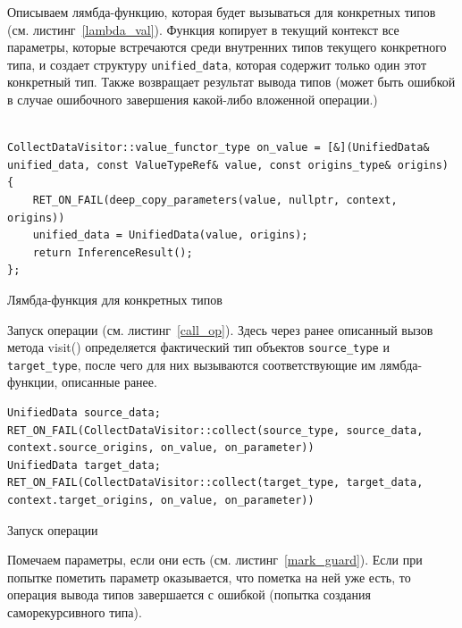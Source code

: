 	Описываем лямбда-функцию, которая будет вызываться для конкретных типов (см. листинг~\ref{lambda_val}).
	Функция копирует в текущий контекст все параметры, которые встречаются среди внутренних типов текущего конкретного типа, и создает структуру \lstinline!unified_data!, которая содержит только один этот конкретный тип.
	Также возвращает результат вывода типов (может быть ошибкой в случае ошибочного завершения какой-либо вложенной операции.)
	
\begin{ListingEnv}[h]
	\begin{lstlisting}
	
CollectDataVisitor::value_functor_type on_value = [&](UnifiedData& unified_data, const ValueTypeRef& value, const origins_type& origins)
{
	RET_ON_FAIL(deep_copy_parameters(value, nullptr, context, origins))
	unified_data = UnifiedData(value, origins);
	return InferenceResult();
};
	\end{lstlisting}
	\caption{Лямбда-функция для конкретных типов}\label{lambda_val}
\end{ListingEnv}
		Запуск операции (см. листинг~\ref{call_op}). Здесь через ранее описанный вызов метода visit() определяется фактический тип объектов \lstinline!source_type! и \lstinline!target_type!, после чего для них вызываются соответствующие им лямбда-функции, описанные ранее.
	
\begin{ListingEnv}[h]
	\begin{lstlisting}
UnifiedData source_data;
RET_ON_FAIL(CollectDataVisitor::collect(source_type, source_data, context.source_origins, on_value, on_parameter))
UnifiedData target_data;
RET_ON_FAIL(CollectDataVisitor::collect(target_type, target_data, context.target_origins, on_value, on_parameter))
	\end{lstlisting}
	\caption{Запуск операции}\label{call_op}
\end{ListingEnv}
		Помечаем параметры, если они есть (см. листинг~\ref{mark_guard}). Если при попытке пометить параметр оказывается, что пометка на ней уже есть, то операция вывода типов завершается с ошибкой (попытка создания саморекурсивного типа).
	
